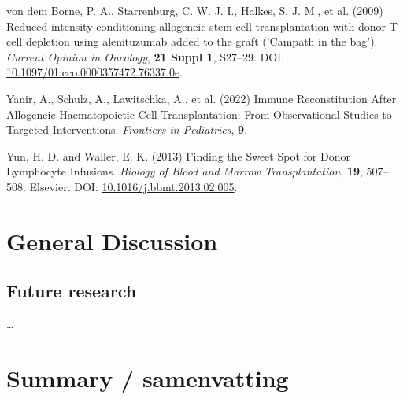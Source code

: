 \documentclass[
  letterpaper,
  DIV=11,
  numbers=noendperiod]{scrreprt}
\newlength{\cslhangindent}
\newlength{\cslentryspacingunit} %
\newenvironment{CSLReferences}[2] %
 {%
  \setlength{\parindent}{0pt}
  \ifodd #1
  \let\oldpar\par
  \def\par{\hangindent=\cslhangindent\oldpar}
  \fi
  \setlength{\parskip}{#2\cslentryspacingunit}
 }%
 {}
\begin{document}
\begin{CSLReferences}{1}{0}
\leavevmode{}%
von dem Borne, P. A., Starrenburg, C. W. J. I., Halkes, S. J. M., et al.
(2009) Reduced-intensity conditioning allogeneic stem cell
transplantation with donor {T-cell} depletion using alemtuzumab added to
the graft ('{Campath} in the bag'). \emph{Current Opinion in Oncology},
\textbf{21 Suppl 1}, S27--29. DOI:
\href{https://doi.org/10.1097/01.cco.0000357472.76337.0e}{10.1097/01.cco.0000357472.76337.0e}.

\leavevmode{}%
Yanir, A., Schulz, A., Lawitschka, A., et al. (2022) Immune
{Reconstitution After Allogeneic Haematopoietic Cell Transplantation}:
{From Observational Studies} to {Targeted Interventions}.
\emph{Frontiers in Pediatrics}, \textbf{9}.

\leavevmode{}%
Yun, H. D. and Waller, E. K. (2013) Finding the {Sweet Spot} for {Donor
Lymphocyte Infusions}. \emph{Biology of Blood and Marrow
Transplantation}, \textbf{19}, 507--508. Elsevier. DOI:
\href{https://doi.org/10.1016/j.bbmt.2013.02.005}{10.1016/j.bbmt.2013.02.005}.

\end{CSLReferences}


\hypertarget{general-discussion}{%
\chapter{General Discussion}\label{general-discussion}}

\hypertarget{future-research}{%
\section{Future research}\label{future-research}}

\ldots{}

\hypertarget{summary-samenvatting}{}

\chapter*{Summary / samenvatting}

\end{document}
